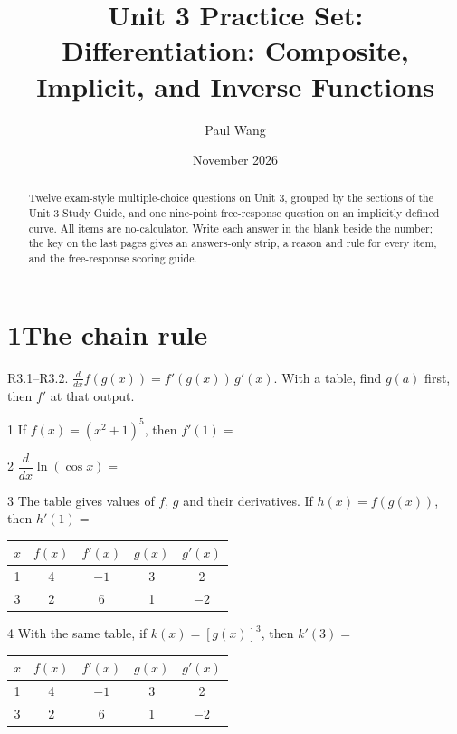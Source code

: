 \documentclass{apcalc}
\title{Unit 3 Practice Set: Differentiation: Composite, Implicit, and Inverse Functions}
\author{Paul Wang}
\date{November 2026}
\begin{document}
\maketitle
\begin{abstract}
Twelve exam-style multiple-choice questions on Unit 3, grouped by the sections of the Unit 3 Study Guide, and one nine-point free-response question on an implicitly defined curve. All items are no-calculator. Write each answer in the blank beside the number; the key on the last pages gives an answers-only strip, a reason and rule for every item, and the free-response scoring guide.
\end{abstract}
\section*{1\quad The chain rule}
\begin{setrule}R3.1–R3.2. $\frac{d}{dx}f(g(x))=f'(g(x))\,g'(x)$. With a table, find $g(a)$ first, then $f'$ at that output.\end{setrule}
\begin{q}{1}
If $f(x)=(x^2+1)^5$, then $f'(1)=$
\end{q}
\begin{q}{2}
$\dfrac{d}{dx}\ln(\cos x)=$
\end{q}
\begin{q}{3}
The table gives values of $f$, $g$ and their derivatives. If $h(x)=f(g(x))$, then $h'(1)=$
\begin{center}\small\renewcommand{\arraystretch}{1.35}\begin{tabular}{|c|c|c|c|c|}
\hline
$x$ & $f(x)$ & $f'(x)$ & $g(x)$ & $g'(x)$ \\ \hline
1 & 4 & $-1$ & 3 & 2 \\ \hline
3 & 2 & 6 & 1 & $-2$ \\ \hline
\end{tabular}\end{center}
\end{q}
\begin{q}{4}
With the same table, if $k(x)=[g(x)]^3$, then $k'(3)=$
\begin{center}\small\renewcommand{\arraystretch}{1.35}\begin{tabular}{|c|c|c|c|c|}
\hline
$x$ & $f(x)$ & $f'(x)$ & $g(x)$ & $g'(x)$ \\ \hline
1 & 4 & $-1$ & 3 & 2 \\ \hline
3 & 2 & 6 & 1 & $-2$ \\ \hline
\end{tabular}\end{center}
\end{q}
\end{document}
